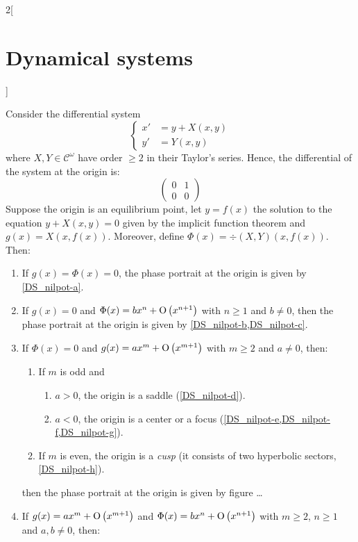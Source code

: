 \documentclass[../../../main_math.tex]{subfiles}
\begin{document}
\begin{multicols}{2}[\section{Dynamical systems}]
\begin{definition}
  \end{definition}
  \begin{theorem}\label{DS_thmB}
    Consider the differential system
    $$
      \left\{
      \begin{aligned}
        {x}' & = y + X(x,y) \\
        {y}' & = Y(x,y)
      \end{aligned}
      \right.
    $$
    where $X,Y\in\mathcal{C}^\omega$ have order $\geq 2$ in their Taylor's series. Hence, the differential of the system at the origin is:
    $$\begin{pmatrix}
        0 & 1 \\
        0 & 0
      \end{pmatrix}$$
    Suppose the origin is an equilibrium point, let $y=f(x)$ the solution to the equation $y+X(x,y)=0$ given by the implicit function theorem and $g(x)=X(x,f(x))$. Moreover, define $\Phi(x)=\div(X,Y)(x,f(x))$. Then:
    \begin{enumerate}
      \renewcommand{\crefpairconjunction}{ or~}
      \item If $g(x)=\Phi(x)= 0$, the phase portrait at the origin is given by \cref{DS_nilpot-a}.
      \item If $g(x)=0$ and $\Phi(x)=bx^n +\mathrm{O}\left(x^{n+1}\right)$ with $n\geq 1$ and $b\ne 0$, then the phase portrait at the origin is given by \cref{DS_nilpot-b,DS_nilpot-c}.
      \item If $\Phi(x)=0$ and $g(x)=ax^m +\mathrm{O}\left(x^{m+1}\right)$ with $m\geq 2$ and $a\ne 0$, then:
            \begin{enumerate}
              \item If $m$ is odd and
                    \begin{enumerate}
                      \item $a>0$, the origin is a saddle (\cref{DS_nilpot-d}).
                      \item $a<0$, the origin is a center or a focus (\cref{DS_nilpot-e,DS_nilpot-f,DS_nilpot-g}).
                    \end{enumerate}
              \item If $m$ is even, the origin is a \emph{cusp} (it consists of two hyperbolic sectors, \cref{DS_nilpot-h}).
            \end{enumerate}
            then the phase portrait at the origin is given by figure \dots
      \item If $g(x)=ax^m +\mathrm{O}\left(x^{m+1}\right)$ and $\Phi(x)=bx^n +\mathrm{O}\left(x^{n+1}\right)$ with $m\geq 2$, $n\geq 1$ and $a,b\ne 0$, then:

\end{enumerate}
\end{theorem}
\end{multicols}
\end{document}
